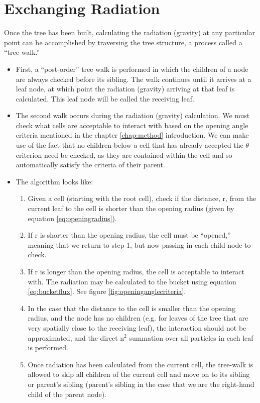 \section{Exchanging Radiation}
\label{sec:exchangerad}
Once the tree has been built, calculating the radiation (gravity) at any particular point can be accomplished by traversing the tree structure, a process called a ``tree walk.''

\begin{itemize}
\item First, a ``post-order'' tree walk is performed in which the children of a node are always checked before its sibling. The walk continues until it arrives at a leaf node, at which point the radiation (gravity) arriving at that leaf is calculated. This leaf node will be called the receiving leaf.
\item The second walk occurs during the radiation (gravity) calculation. We must check what cells are acceptable to interact with based on the opening angle criteria mentioned in the chapter \ref{chap:method} introduction. We can make use of the fact that no children below a cell that has already accepted the $\theta$ criterion need be checked, as they are contained within the cell and so automatically satisfy the criteria of their parent.
\item The algorithm looks like:
	\begin{enumerate}
	\item Given a cell (starting with the root cell), check if the distance, r, from the current leaf to the cell is shorter than the opening radius (given by equation \ref{eq:openingradius}).
	\item If r is shorter than the opening radius, the cell must be ``opened,'' meaning that we return to step 1, but now passing in each child node to check.
	\item If r is longer than the opening radius, the cell is acceptable to interact with. The radiation may be calculated to the bucket using equation \ref{eq:bucketflux}. See figure \ref{fig:openinganglecriteria}.
	\item In the case that the distance to the cell is smaller than the opening radius, and the node has no children (e.g. for leaves of the tree that are very spatially close to the receiving leaf), the interaction should not be approximated, and the direct n$^2$ summation over all particles in each leaf is performed.
	\item Once radiation has been calculated from the current cell, the tree-walk is allowed to skip all children of the current cell and move on to its sibling or parent's sibling (parent's sibling in the case that we are the right-hand child of the parent node). 

\end{enumerate}
\end{itemize}
